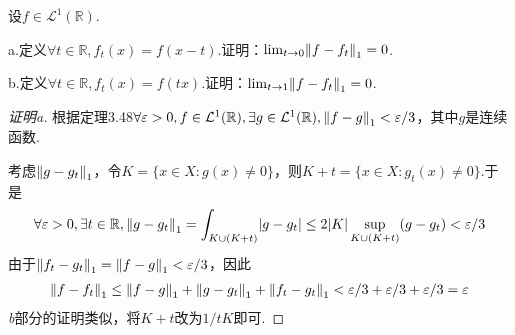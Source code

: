 \newpage

\begin{problem}[16]\label{3.B.16}
    设\(f \in \mathcal{L}^1(\mathbb{R})\).

    a.定义\(\forall t \in \mathbb{R}, f_t(x)=f(x-t)\).证明：\(\lim_{t \to 0} \norm*{f-f_t}_1=0\).

    b.定义\(\forall t \in \mathbb{R}, f_t(x)=f(tx)\).证明：\(\lim_{t \to 1} \norm*{f-f_t}_1=0\).
\end{problem}

\begin{proof}[证明a]
    根据定理3.48\(\forall \varepsilon>0, f \in \mathcal{L}^1(\mathbb{R}), \exists g \in \mathcal{L}^1(\mathbb{R}), \norm*{f-g}_1<\varepsilon/3\)，其中\(g\)是连续函数.

    考虑\(\norm*{g-g_t}_1\)，令\(K=\{x \in X: g(x) \ne 0\}\)，则\(K+t=\{x \in X: g_t(x) \ne 0\}\).于是
    \begin{align*}
        \forall \varepsilon>0, \exists t \in \mathbb{R}, \norm*{g-g_t}_1=\int_{K \cup (K+t)} \abs*{g-g_t} \leq 2\abs*{K} \sup_{K \cup (K+t)}(g-g_t)<\varepsilon/3
    \end{align*}
    由于\(\norm*{f_t-g_t}_1=\norm*{f-g}_1<\varepsilon/3\)，因此
    \begin{align*}
        \norm*{f-f_t}_1 \leq \norm*{f-g}_1+\norm*{g-g_t}_1+\norm*{f_t-g_t}_1<\varepsilon/3+\varepsilon/3+\varepsilon/3=\varepsilon
    \end{align*}
    {\kaishu \textit{b}部分的证明类似，将\(K+t\)改为\(1/t K\)即可.}
\end{proof}